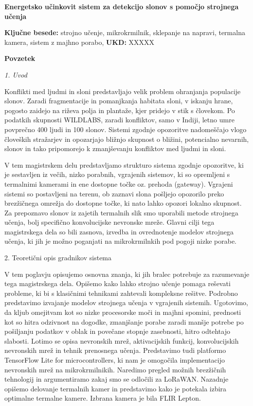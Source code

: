 \begin{poglavje}
\noindent\bfseries Energetsko učinkovit sistem za detekcijo slonov s pomočjo strojnega učenja
\end{poglavje}

\bigskip
\bigskip
\bigskip
\bigskip
\bigskip
\textbf{Ključne besede:} strojno učenje, mikrokrmilnik, sklepanje na napravi, termalna kamera, sistem z majhno porabo, 
\bigskip
\textbf{UKD:} XXXXX

\bigskip
\bigskip
\bigskip
\bigskip
\bigskip
\bigskip
\textbf{Povzetek}
\newline
\newline
{\itshape
1. Uvod

Konflikti med ljudmi in sloni predstavljajo velik problem ohranjanja populacije slonov.
Zaradi fragmentacije in pomanjkanja habitata sloni, v iskanju hrane, pogosto zaidejo na riževa polja in plantaže, kjer pridejo v stik s človekom.
Po podatkih skupnosti WILDLABS, zaradi konfliktov, samo v Indiji, letno umre povprečno 400 ljudi in 100 slonov.
Sistemi zgodnje opozoritve nadomeščajo vlogo človeških stražarjev in opozarjajo bližnjo skupnost o bližini, potencialno nevarnih, slonov in tako pripomorejo k zmanjševanju konfliktov med ljudmi in sloni.

V tem magistrskem delu predstavljamo strukturo sistema zgodnje opozoritve, ki je sestavljen iz večih, nizko porabnih, vgrajenih sistemov, ki so opremljeni s termalnimi kamerami in ene dostopne točke oz. prehoda (gateway).
Vgrajeni sistemi so postavljeni na terenu, ob zaznavi slona pošljejo opozorilo preko brezžičnega omrežja do dostopne točke, ki nato lahko opozori lokalno skupnost.
Za prepoznavo slonov iz zajetih termalnih slik smo uporabili metode strojnega učenja, bolj specifično konvolucijske nevronske mreže.
Glavni cilji tega magistrskega dela so bili zasnova, izvedba in ovrednotenje modelov strojnega učenja, ki jih je možno poganjati na mikrokrmilnkih pod pogoji nizke porabe.

2. Teoretični opis gradnikov sistema

V tem poglavju opisujemo osnovna znanja, ki jih bralec potrebuje za razumevanje tega magistrskega dela.
Opišemo kako lahko strojno učenje pomaga reševati probleme, ki bi s klasičnimi tehnikami zahtevali kompleksne rešitve. 
Podrobno predstavimo izvajanje modelov strojnega učenja v vgrajenih sistemih.
Ugotovimo, da kljub omejitvam kot so nizke procesorske moči in majhni spomini, prednosti kot so hitra odzivnost na dogodke, zmanjšanje porabe zaradi manšje potrebe po pošiljanju podatkov v oblak in povečane stopnje zasebnosti, hitro odtehtajo slabosti.
Lotimo se opisa nevronskih mrež, aktivacijskih funkcij, konvolucijskih nevronskih mrež in tehnik prenosnega učenja.
Predstavimo tudi platformo TensorFlow Lite for microcontrollers, ki nam je omogočila implementacijo nevronskih mrež na mikrokrmilnikih.
Naredimo pregled možnih brezžičnih tehnologij in argumentiramo zakaj smo se odločili za LoRaWAN.
Nazadnje opišemo delovanje termalnih kamer in predstavimo kako je potekala izbira optimalne termalne kamere.
Izbrana kamera je bila FLIR Lepton.
\newline


}
